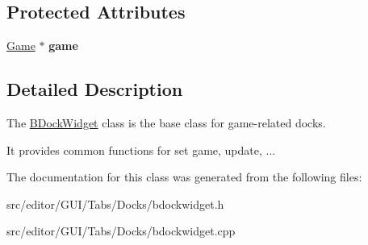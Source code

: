 \subsection*{Protected Attributes}
\begin{DoxyCompactItemize}
\item 
\hypertarget{class_b_dock_widget_a2cd159222e09c8034a5ee46628a95fc0}{}\label{class_b_dock_widget_a2cd159222e09c8034a5ee46628a95fc0} 
\hyperlink{class_game}{Game} $\ast$ {\bfseries game}
\end{DoxyCompactItemize}


\subsection{Detailed Description}
The \hyperlink{class_b_dock_widget}{B\+Dock\+Widget} class is the base class for game-\/related docks. 

It provides common functions for set game, update, ... 

The documentation for this class was generated from the following files\+:\begin{DoxyCompactItemize}
\item 
src/editor/\+G\+U\+I/\+Tabs/\+Docks/bdockwidget.\+h\item 
src/editor/\+G\+U\+I/\+Tabs/\+Docks/bdockwidget.\+cpp\end{DoxyCompactItemize}
